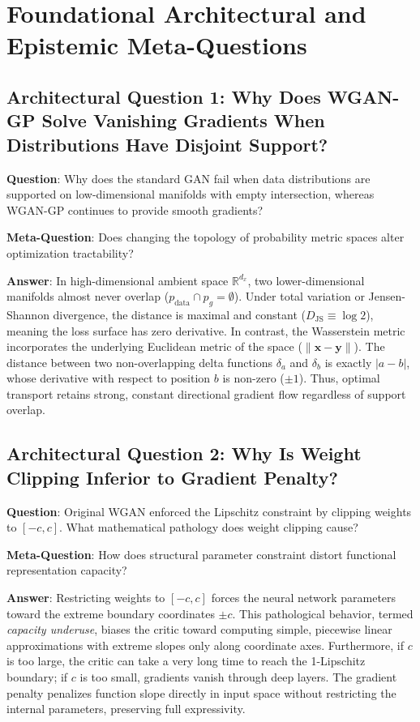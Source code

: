 \documentclass[11pt,a4paper]{article}
\theoremstyle{definition}
\begin{document}
\section{Foundational Architectural and Epistemic Meta-Questions}

\subsection{Architectural Question 1: Why Does WGAN-GP Solve Vanishing Gradients When Distributions Have Disjoint Support?}
\textbf{Question}: Why does the standard GAN fail when data distributions are supported on low-dimensional manifolds with empty intersection, whereas WGAN-GP continues to provide smooth gradients?

\textbf{Meta-Question}: Does changing the topology of probability metric spaces alter optimization tractability?

\textbf{Answer}: In high-dimensional ambient space $\mathbb{R}^{d_x}$, two lower-dimensional manifolds almost never overlap ($p_{\text{data}} \cap p_g = \emptyset$). Under total variation or Jensen-Shannon divergence, the distance is maximal and constant ($D_{\text{JS}} \equiv \log 2$), meaning the loss surface has zero derivative. In contrast, the Wasserstein metric incorporates the underlying Euclidean metric of the space ($\|\mathbf{x} - \mathbf{y}\|$). The distance between two non-overlapping delta functions $\delta_a$ and $\delta_b$ is exactly $|a - b|$, whose derivative with respect to position $b$ is non-zero ($\pm 1$). Thus, optimal transport retains strong, constant directional gradient flow regardless of support overlap.

\subsection{Architectural Question 2: Why Is Weight Clipping Inferior to Gradient Penalty?}
\textbf{Question}: Original WGAN enforced the Lipschitz constraint by clipping weights to $[-c, c]$. What mathematical pathology does weight clipping cause?

\textbf{Meta-Question}: How does structural parameter constraint distort functional representation capacity?

\textbf{Answer}: Restricting weights to $[-c, c]$ forces the neural network parameters toward the extreme boundary coordinates $\pm c$. This pathological behavior, termed \emph{capacity underuse}, biases the critic toward computing simple, piecewise linear approximations with extreme slopes only along coordinate axes. Furthermore, if $c$ is too large, the critic can take a very long time to reach the 1-Lipschitz boundary; if $c$ is too small, gradients vanish through deep layers. The gradient penalty penalizes function slope directly in input space without restricting the internal parameters, preserving full expressivity.
\end{document}
